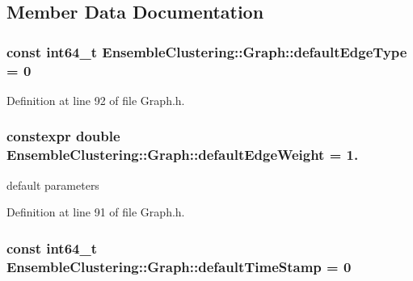 \subsection{Member Data Documentation}
\hypertarget{class_ensemble_clustering_1_1_graph_a377621f37c1dc58f32ecec0fd229408e}{
\subsubsection[{default\-Edge\-Type}]{\setlength{\rightskip}{0pt plus 5cm}const int64\-\_\-t Ensemble\-Clustering\-::\-Graph\-::default\-Edge\-Type = 0\hspace{0.3cm}{\ttfamily [static]}}}\label{class_ensemble_clustering_1_1_graph_a377621f37c1dc58f32ecec0fd229408e}


Definition at line 92 of file Graph.\-h.

\hypertarget{class_ensemble_clustering_1_1_graph_a8186ee969064a4e12b779b1dc506ac60}{
\subsubsection[{default\-Edge\-Weight}]{\setlength{\rightskip}{0pt plus 5cm}constexpr double Ensemble\-Clustering\-::\-Graph\-::default\-Edge\-Weight = 1.\hspace{0.3cm}{\ttfamily [static]}}}\label{class_ensemble_clustering_1_1_graph_a8186ee969064a4e12b779b1dc506ac60}


default parameters 



Definition at line 91 of file Graph.\-h.

\hypertarget{class_ensemble_clustering_1_1_graph_a9a6623d55f673a3b30e0c23284dd6da1}{
\subsubsection[{default\-Time\-Stamp}]{\setlength{\rightskip}{0pt plus 5cm}const int64\-\_\-t Ensemble\-Clustering\-::\-Graph\-::default\-Time\-Stamp = 0\hspace{0.3cm}{\ttfamily [static]}}}\label{class_ensemble_clustering_1_1_graph_a9a6623d55f673a3b30e0c23284dd6da1}


